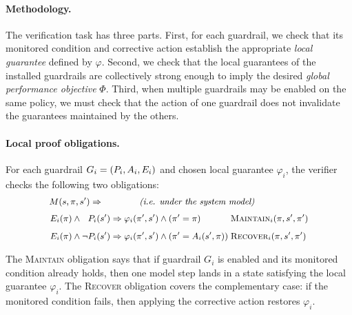 \paragraph{Methodology.}
The verification task has three parts. First, for each guardrail, we check that its monitored condition and corrective action establish the appropriate \emph{local guarantee} defined by $\varphi$. Second, we check that the local guarantees of the installed guardrails are collectively strong enough to imply the desired \emph{global performance objective} $\Phi$. Third, when multiple guardrails may be enabled on the same policy, we must check that the action of one guardrail does not invalidate the guarantees maintained by the others. 

\paragraph{Local proof obligations.}
For each guardrail $G_i = (P_{i},A_{i},E_i)$ and chosen local guarantee $\varphi_i$, the verifier checks the following two obligations:
\[ \small
\begin{array}{l@{\hspace{0.1em}}l@{\;}l}
\multicolumn{3}{l}{
M(s, \pi, s') \Rightarrow
\hspace{4em}\textit{(i.e. under the system model)}
} \\[0.7em]
& E_i(\pi) \wedge 
\phantom{\neg}
P_i(s')
\Rightarrow 
\varphi_i(\pi',s')
\wedge
(\pi' = \pi)
&
\textsc{Maintain}_{i}(\pi, s', \pi')
\\[0.8em]
& E_i(\pi) \wedge \neg P_i(s')
\Rightarrow
\varphi_i(\pi',s')
\wedge
(\pi' = A_i(s',\pi))
&
\textsc{Recover}_i(\pi, s', \pi')
\end{array}
\]



The \textsc{Maintain} obligation says that if guardrail $G_i$ is enabled and its monitored condition already holds, then one model step lands in a state satisfying the local guarantee $\varphi_i$. The \textsc{Recover} obligation covers the complementary case: if the monitored condition fails, then applying the corrective action restores $\varphi_i$.


